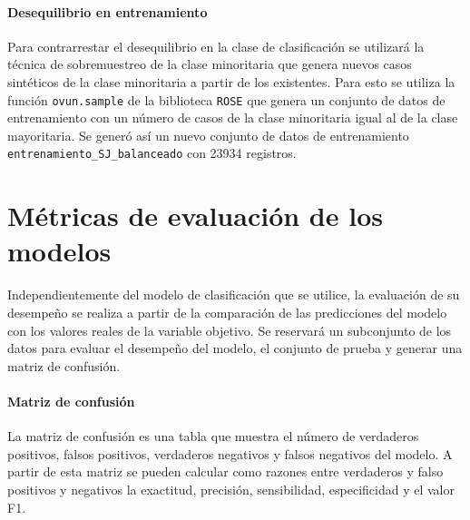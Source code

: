 \documentclass[a4paper]{report}
\begin{document}
\paragraph{Desequilibrio en entrenamiento}
Para contrarrestar el desequilibrio en la clase de clasificación se utilizará la técnica de sobremuestreo de la clase minoritaria que genera nuevos casos sintéticos de la clase minoritaria a partir de los existentes.
Para esto se utiliza la función \verb'ovun.sample' de la biblioteca \verb'ROSE' que genera un conjunto de datos de entrenamiento con un número de casos de la clase minoritaria igual al de la clase mayoritaria.
Se generó así un nuevo conjunto de datos de entrenamiento \verb'entrenamiento_SJ_balanceado' con \num{23934} registros.









\section{Métricas de evaluación de los modelos}

Independientemente del modelo de clasificación que se utilice, la evaluación de su desempeño se realiza a partir de la comparación de las predicciones del modelo con los valores reales de la variable objetivo.
Se reservará un subconjunto de los datos para evaluar el desempeño del modelo, el conjunto de prueba y generar una matriz de confusión.

\paragraph{Matriz de confusión}
La matriz de confusión es una tabla que muestra el número de verdaderos positivos, falsos positivos, verdaderos negativos y falsos negativos del modelo.
A partir de esta matriz se pueden calcular como razones entre verdaderos y falso positivos y negativos la exactitud, precisión, sensibilidad, especificidad y el valor F1.
\end{document}
